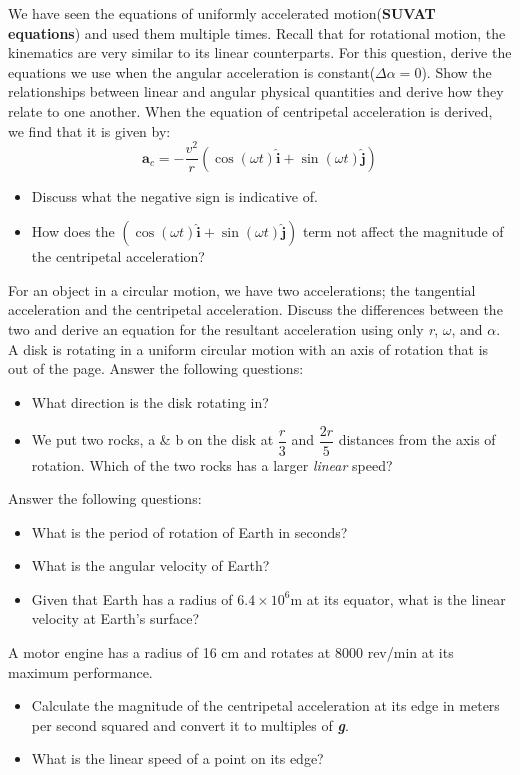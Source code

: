 \documentclass[9pt,addpoints]{exam}
\begin{document}
				
				\begin{questions}
					\question We have seen the equations of uniformly accelerated motion(\textbf{SUVAT equations}) and used them multiple times. Recall that for rotational motion, the kinematics are very similar to its linear counterparts. For this question, derive the equations we use when the angular acceleration is constant($\varDelta\alpha=0$).
					\question Show the relationships between linear and angular physical quantities and derive how they relate to one another.
					\question When the equation of centripetal acceleration is derived, we find that it is given by:
					$$\textbf{a}_c=-\dfrac{v^2}{r}(\cos(\omega t)\hat{\textbf{i}}+\sin(\omega t)\hat{\textbf{j}})$$
					\begin{itemize}
						\item Discuss what the negative sign is indicative of.
						\item How does the $(\cos(\omega t)\hat{\textbf{i}}+\sin(\omega t)\hat{\textbf{j}})$ term not affect the magnitude of the centripetal acceleration?
					\end{itemize}
					\question For an object in a circular motion, we have two accelerations; the tangential acceleration and the centripetal acceleration. Discuss the differences between the two and derive an equation for the resultant acceleration using only \textit{r}, \textit{$\omega$}, and \textit{$\alpha$}.
					\question A disk is rotating in a uniform circular motion with an axis of rotation that is out of the page. Answer the following questions:
						\begin{itemize}
							\item What direction is the disk rotating in?
							\item We put two rocks, a \& b on the disk at $\dfrac{r}{3}$ and $\dfrac{2r}{5}$ distances from the axis of rotation. Which of the two rocks has a larger \textit{linear} speed?
						\end{itemize}
					\question Answer the following questions:
					\begin{itemize}
						\item What is the period of rotation of Earth in seconds? 
						\item What is the angular velocity of Earth?
						\item Given that Earth has a radius of  $6.4\times10^6$m at its equator, what is the linear velocity at Earth's surface?
				\end{itemize}
					\question A motor engine has a radius of 16 cm and rotates at 8000 rev/min at its maximum performance.
					\begin{itemize}
						\item Calculate the magnitude of the centripetal acceleration at its edge in meters per second squared and convert it to multiples of \textbf{\textit{g}}.
						\item What is the linear speed of a point on its edge?
					\end{itemize}
					
				\end{questions}		
			
\end{document}
